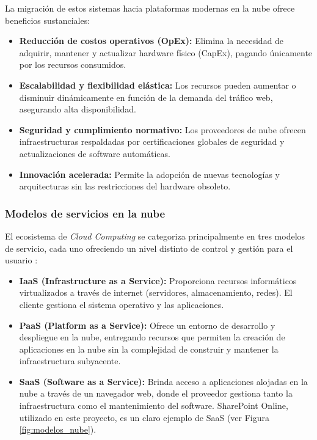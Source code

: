 La migración de estos sistemas hacia plataformas modernas en la nube ofrece beneficios sustanciales:
\begin{itemize}
    \item \textbf{Reducción de costos operativos (OpEx):} Elimina la necesidad de adquirir, mantener y actualizar hardware físico (CapEx), pagando únicamente por los recursos consumidos.
    \item \textbf{Escalabilidad y flexibilidad elástica:} Los recursos pueden aumentar o disminuir dinámicamente en función de la demanda del tráfico web, asegurando alta disponibilidad.
    \item \textbf{Seguridad y cumplimiento normativo:} Los proveedores de nube ofrecen infraestructuras respaldadas por certificaciones globales de seguridad y actualizaciones de software automáticas.
    \item \textbf{Innovación acelerada:} Permite la adopción de nuevas tecnologías y arquitecturas sin las restricciones del hardware obsoleto.
\end{itemize}

\subsubsection*{Modelos de servicios en la nube}

El ecosistema de \textit{Cloud Computing} se categoriza principalmente en tres modelos de servicio, cada uno ofreciendo un nivel distinto de control y gestión para el usuario \cite{marston2011cloud}:

\begin{itemize}
    \item \textbf{IaaS (Infrastructure as a Service):} Proporciona recursos informáticos virtualizados a través de internet (servidores, almacenamiento, redes). El cliente gestiona el sistema operativo y las aplicaciones.
    \item \textbf{PaaS (Platform as a Service):} Ofrece un entorno de desarrollo y despliegue en la nube, entregando recursos que permiten la creación de aplicaciones en la nube sin la complejidad de construir y mantener la infraestructura subyacente.
    \item \textbf{SaaS (Software as a Service):} Brinda acceso a aplicaciones alojadas en la nube a través de un navegador web, donde el proveedor gestiona tanto la infraestructura como el mantenimiento del software. SharePoint Online, utilizado en este proyecto, es un claro ejemplo de SaaS \cite{microsoft2024sharepoint} (ver Figura \ref{fig:modelos_nube}).
\end{itemize}

